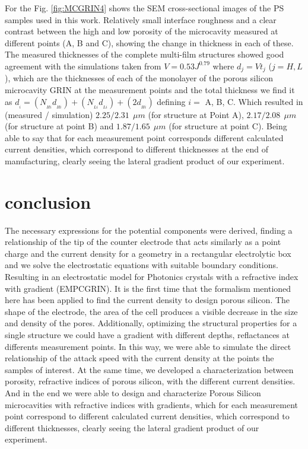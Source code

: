 \documentclass{article}
\begin{document}
For the Fig. \ref{fig:MCGRIN4} shows the SEM cross-sectional images of
the PS samples used in this work. Relatively small interface
roughness and a clear contrast between the high and low porosity of
the microcavity measured at different points (A, B and C), showing the
change in thickness in each of these. The measured thicknesses of the
complete multi-film structures showed good agreement with the
simulations taken from $ V = 0.53J^{0.79} $ where $d_j=Vt_j$
($j=H,L$), which are the thicknesses of each of the monolayer of the
porous silicon microcavity GRIN at the measurement points and the
total thickness we find it as $d_{_{i}} =
(N_{_{Hi}}d_{_{Hi}})+(N_{_{Li}}d_{_{Li}}) + (2d_{_{Hi}})$ defining $ i
= $ A, B, C. Which resulted in (measured / simulation) $ 2.25 / 2.31 \
\ \mu m $ (for structure at Point A), $ 2.17 / 2.08 \ \ \mu m $ (for
structure at point B) and $ 1.87 / 1.65 \ \ \mu m $ (for structure at
point C).
Being able to say that for each measurement point corresponds
different calculated current densities, which correspond to different
thicknesses at the end of manufacturing, clearly seeing the lateral
gradient product of our experiment.


\section{conclusion}
The necessary expressions for the potential components were derived,
finding a relationship of the tip of the counter electrode that acts
similarly as a point charge and the current density for a geometry in
a rectangular electrolytic box and we solve the electrostatic
equations with suitable boundary conditions. Resulting in an
electrostatic model for  Photonics crystals with a refractive index
with gradient (EMPCGRIN).
It is the first time that the formalism mentioned here has been
applied to find the current density to design porous silicon. The
shape of the electrode, the area of the cell produces a visible
decrease in the size and density of the pores. Additionally,
optimizing the structural properties for a single structure we could
have a gradient with different depths, reflactances at differents
measurement points. In this way, we were able to simulate the direct
relationship of the attack speed with the current density at the
points  the samples of interest. At the same time, we developed a
characterization between porosity, refractive indices of porous
silicon, with the different current densities. And in the end we were
able to design and characterize Porous Silicon microcavities with
refractive indices with gradients, which for each measurement point
correspond to different calculated current densities, which correspond
to different thicknesses, clearly seeing the lateral gradient product
of our experiment.
\end{document}
